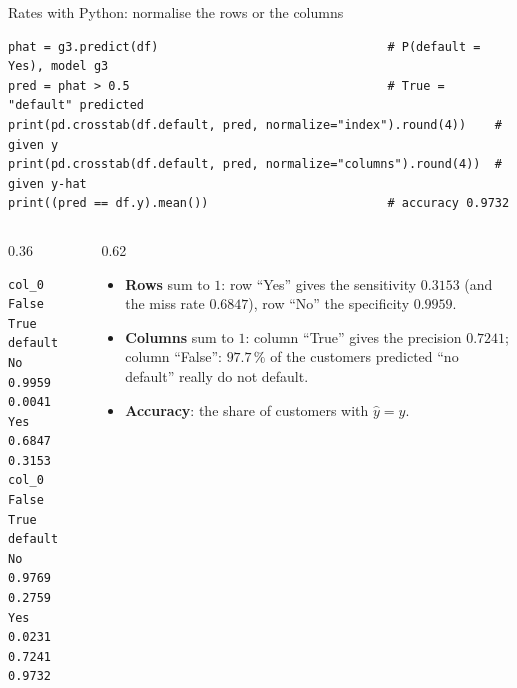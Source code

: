 \documentclass[aspectratio=169,11pt]{beamer}
\begin{document}
\begin{frame}[fragile]{Rates with Python: normalise the rows or the columns}
\begin{lstlisting}
phat = g3.predict(df)                                # P(default = Yes), model g3
pred = phat > 0.5                                    # True = "default" predicted
print(pd.crosstab(df.default, pred, normalize="index").round(4))    # given y
print(pd.crosstab(df.default, pred, normalize="columns").round(4))  # given y-hat
print((pred == df.y).mean())                         # accuracy 0.9732
\end{lstlisting}
  \begin{columns}[T]
    \begin{column}{0.36\textwidth}
\begin{lstlisting}[style=Pyout]
col_0     False   True
default
No       0.9959  0.0041
Yes      0.6847  0.3153
col_0     False   True
default
No       0.9769  0.2759
Yes      0.0231  0.7241
0.9732
\end{lstlisting}
    \end{column}
    \begin{column}{0.62\textwidth}
      \small
      \begin{itemize}\setlength{\itemsep}{3pt}
        \item \textbf{Rows} sum to $1$: row ``Yes'' gives the sensitivity
              $0.3153$ (and the miss rate $0.6847$), row ``No'' the
              specificity $0.9959$.
        \item \textbf{Columns} sum to $1$: column ``True'' gives the
              precision $0.7241$; column ``False'': $97.7\,\%$ of the
              customers predicted ``no default'' really do not default.
        \item \textbf{Accuracy}: the share of customers with $\hat y=y$.
      \end{itemize}
    \end{column}
  \end{columns}
\end{frame}
\end{document}
